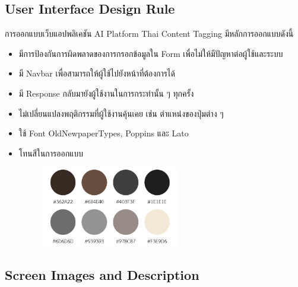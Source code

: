 \documentclass[12pt,oneside,openright,a4paper]{cpe-thai-project}
\begin{document}
\subsection{User Interface Design Rule}
การออกแบบเว็บแอปพลิเคชัน AI Platform Thai Content Tagging มีหลักการออกแบบดังนี้
\begin{itemize}
  \item มีการป้องกันการผิดพลาดของการกรอกข้อมูลใน Form เพื่อไม่ให้มีปัญหาต่อผู้ใช้และระบบ
  \item มี Navbar เพื่อสามารถให้ผู้ใช้ไปยังหน้าที่ต้องการได้
  \item มี Response กลับมายังผู้ใช้งานในการกระทำนั้น ๆ ทุกครั้ง
  \item ไม่เปลี่ยนแปลงพฤติกรรมที่ผู้ใช้งานคุ้นเคย เช่น ตำแหน่งของปุ่มต่าง ๆ
  \item ใช้ Font OldNewpaperTypes, Poppins และ Lato
  \item โทนสีในการออกแบบ 
        \begin{figure}[!ht]\centering
          \includegraphics[height=3.5cm]{./img/color.png} 
        \end{figure}
\end{itemize}

\newpage
\subsection{Screen Images and Description}
\end{document}
